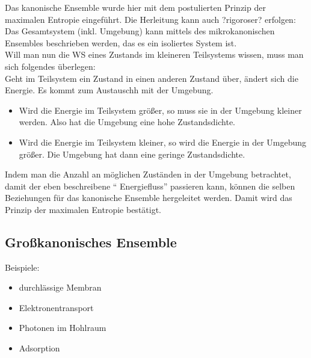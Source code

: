 Das kanonische Ensemble wurde hier mit dem postulierten Prinzip der maximalen Entropie eingeführt.
Die Herleitung kann auch ?rigoroser? erfolgen:\\
Das Gesamtsystem (inkl. Umgebung) kann mittels des mikrokanonischen Ensembles beschrieben werden, das es ein isoliertes System ist.
\\ Will man nun die WS eines Zustands im kleineren Teilsystems wissen, muss man sich folgendes überlegen:\\
Geht im Teilsystem ein Zustand in einen anderen Zustand über, ändert sich die Energie. Es kommt zum Austauschh mit der Umgebung.
\begin{itemize}
    \item Wird die Energie im Teilsystem größer, so muss sie in der Umgebung kleiner werden. Also hat die Umgebung eine hohe Zustandsdichte.
    \item Wird die Energie im Teilsystem kleiner, so wird die Energie in der Umgebung größer. Die Umgebung hat dann eine geringe Zustandsdichte.
\end{itemize}
Indem man die Anzahl an möglichen Zuständen in der Umgebung betrachtet, damit der eben beschreibene \enquote{ Energiefluss} passieren kann, können die selben Beziehungen für das kanonische Ensemble hergeleitet werden.
Damit wird das Prinzip der maximalen Entropie bestätigt.
\color{black}


\subsection{Großkanonisches Ensemble}\label{sec.Großkanonisches Ensemble}

\begin{center}
\end{center}

Beispiele:
\begin{itemize}
    \item durchlässige Membran
    \item Elektronentransport
    \item Photonen im Hohlraum
    \item Adsorption
\end{itemize}


